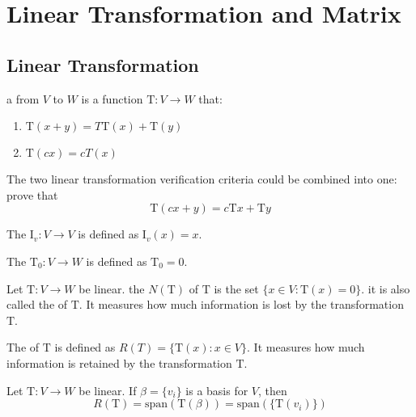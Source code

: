 \section{Linear Transformation and Matrix}

\subsection{Linear Transformation}


\begin{definition}
	a   from $V$ to $W$ is a function $\mathrm{T}: V \rightarrow W$ that:
	\begin{enumerate}
		\item $\mathrm{T}(x+y) = T\mathrm{T}(x) + \mathrm{T}(y)$
		\item $\mathrm{T}(c x) = c T(x)$
	\end{enumerate}
\end{definition}

The two linear transformation verification criteria could be combined into one: prove that 
\begin{equation}
    \mathrm{T}(cx + y) = c\mathrm{T}x+\mathrm{T}y
\end{equation}


The   $\mathrm{I}_v : V \rightarrow V$ is defined as $\mathrm{I}_v(x) = x$.

The   $\mathrm{T}_0: V \rightarrow W$ is defined as $\mathrm{T}_0 = 0$.

\begin{definition}
	Let $\mathrm{T}:V \rightarrow W$ be linear. the   $N(\mathrm{T})$ of $\mathrm{T}$ is the set $\{x \in V : \mathrm{T}(x) = 0 \}$. it is also called the  of $\mathrm{T}$. It measures how much  information is lost by the transformation $\mathrm{T}$.
\end{definition}

\begin{definition}
	The   of $\mathrm{T}$ is defined as $R(T) = \{ {\mathrm{T}(x):x \in V} \}$. It measures how much information is retained by the transformation $\mathrm{T}$.
\end{definition}

\begin{theorem}
	Let $\mathrm{T}: V \rightarrow W$ be linear. If $\beta=\{v_i\}$ is a basis for $V$, then
	\begin{equation}
		R(\mathrm{T}) = \text{span}(\mathrm{T}(\beta)) = \text{span}( \{ \mathrm{T}(v_i) \} )
	\end{equation}
\end{theorem}

